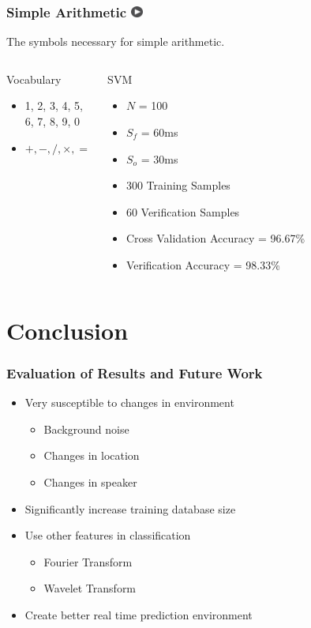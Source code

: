 \documentclass{beamer}
\begin{document}
\begin{frame}
\frametitle{Simple Arithmetic 
\href{images/math.mp4}{\includegraphics[width=0.15in]{images/play.png}}}
The symbols necessary for simple arithmetic.
\begin{columns}[c]
  \column{1.5in}
	\begin{block}{Vocabulary}
		\begin{itemize}
		\item 1, 2, 3, 4, 5,\\ 6, 7, 8, 9, 0
		\item $+, -, /, \times, =$
		\end{itemize}
	\end{block}
  \column{2.5in}
  	\begin{block}{SVM}
		\begin{itemize}
		\item $N$ = 100
		\item $S_f$ = 60ms
		\item $S_o$ = 30ms
		\item 300 Training Samples
		\item 60 Verification Samples
		\item \small{Cross Validation Accuracy = 96.67\%}
		\item Verification Accuracy = 98.33\%
		\end{itemize}
	\end{block}
\end{columns}
\end{frame}

\section{Conclusion}

\begin{frame}
\frametitle{Evaluation of Results and Future Work}
\begin{block}{}
\begin{itemize}
	\item Very susceptible to changes in environment
	\begin{itemize}
		\item Background noise
		\item Changes in location
		\item Changes in speaker
	\end{itemize}
	\item Significantly increase training database size
	\item Use other features in classification
	\begin{itemize}
		\item Fourier Transform
		\item Wavelet Transform
	\end{itemize}
	\item Create better real time prediction environment
\end{itemize}
\end{block}
\end{frame}
\end{document}
